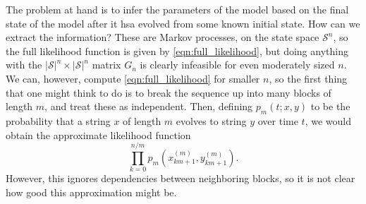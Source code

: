 \documentclass{article}
\newcommand{\peter}[1]{\todo[color=green!40]{Peter: #1}}
\newcommand{\calS}{\mathcal{S}}  %
\theoremstyle{plain}
\theoremstyle{definition}
\begin{document}
\peter{refer to figure}

The problem at hand is to infer the parameters of the model based on the final state of the model after it hsa evolved from some known initial state.
How can we extract the information?
These are Markov processes, on the state space $\calS^n$,
so the full likelihood function is given by \eqref{eqn:full_likelihood},
but doing anything with the $|\calS|^n \times |\calS|^n$ matrix $G_n$ is clearly infeasible for even moderately sized $n$.
We can, however, compute \eqref{eqn:full_likelihood} for smaller $n$,
so the first thing that one might think to do is to break the sequence up into many blocks of length $m$,
and treat these as independent.
Then, defining $p_m(t;x,y)$ to be the probability that a string $x$ of length $m$ evolves to string $y$ over time $t$,
we would obtain the approximate likelihood function
\[
  \prod_{k=0}^{n/m} p_m(x_{km+1}^{(m)},y_{km+1}^{(m)}) .
\]
However, this ignores dependencies between neighboring blocks,
so it is not clear how good this approximation might be.
\end{document}
